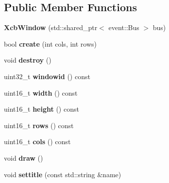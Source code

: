 \subsection*{Public Member Functions}
\begin{DoxyCompactItemize}
\item 
\mbox{\label{classxcbwin_1_1XcbWindow_ad24fd87dd38023ffa3952990bb1b85af}} 
{\bfseries Xcb\+Window} (std\+::shared\+\_\+ptr$<$ event\+::\+Bus $>$ bus)
\item 
\mbox{\label{classxcbwin_1_1XcbWindow_a0baf070f56ff40c9579f6e6e89619f38}} 
bool {\bfseries create} (int cols, int rows)
\item 
\mbox{\label{classxcbwin_1_1XcbWindow_a8496f33819abe49a9f3c87fcfb8c5dff}} 
void {\bfseries destroy} ()
\item 
\mbox{\label{classxcbwin_1_1XcbWindow_a5209201972d386c9ddf68dc88e6318cc}} 
uint32\+\_\+t {\bfseries windowid} () const
\item 
\mbox{\label{classxcbwin_1_1XcbWindow_a57d5f38761328eb088227742c91e64fa}} 
uint16\+\_\+t {\bfseries width} () const
\item 
\mbox{\label{classxcbwin_1_1XcbWindow_a6105df2ed1f5e76752088366c1d6784f}} 
uint16\+\_\+t {\bfseries height} () const
\item 
\mbox{\label{classxcbwin_1_1XcbWindow_a8fefe3fe52230ecfd5bc4278fb0dfdd3}} 
uint16\+\_\+t {\bfseries rows} () const
\item 
\mbox{\label{classxcbwin_1_1XcbWindow_aef8f387a6abf033d022a30f119cbe62e}} 
uint16\+\_\+t {\bfseries cols} () const
\item 
\mbox{\label{classxcbwin_1_1XcbWindow_a5e7781f11292928c1f2a1a4a2dc491bd}} 
void {\bfseries draw} ()
\item 
\mbox{\label{classxcbwin_1_1XcbWindow_abeaeefc359ad7946f5ffa3cd17416c65}} 
void {\bfseries settitle} (const std\+::string \&name)

\end{DoxyCompactItemize}
